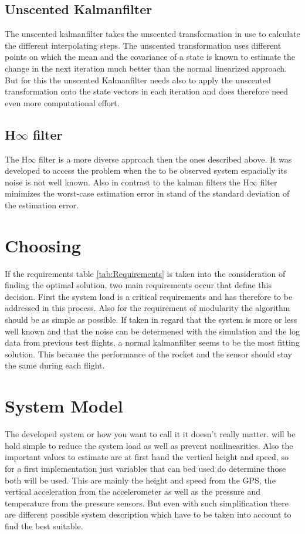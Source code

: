   \subsection{Unscented Kalmanfilter}
  The unscented kalmanfilter takes the unscented transformation in use to calculate the different interpolating steps.
  The unscented transformation uses different points on which the mean and the covariance of a state is known to estimate the 
  change in the next iteration much better than the normal linearized approach.
  But for this the unscented Kalmanfilter needs also to apply the unscented transformation onto the state vectors in each iteration
  and does therefore need even more computational effort.
  
  \subsection{H$\infty$ filter}
  The H$\infty$ filter is a more diverse approach then the ones described above.
  It was developed to access the problem when the to be observed system espacially its noise is not well known.
  Also in contrast to the kalman filters the H$\infty$ filter minimizes the worst-case estimation error 
  in stand of the standard deviation of the estimation error.
  
  \section{Choosing}
  If the requirements table \ref{tab:Requirements} is taken into the consideration of finding
  the optimal solution, two main requirements occur that define this decision.
  First the system load is a critical requirements and has therefore to be addressed in this process.
  Also for the requirement of modularity the algorithm should be as simple as possible.
  If taken in regard that the system is more or less well known and that the noise can be
  determened with the simulation and the log data from previous test flights,
  a normal kalmanfilter seems to be the most fitting solution.
  This because the performance of the rocket and the sensor should stay the same during
  each flight. 
  
  \section{System Model}
  The developed system or how you want to call it it doesn't really matter.
  will be hold simple to reduce the system load as well as prevent nonlinearities.
  Also the important values to estimate are at first hand the vertical height and speed, so
  for a first implementation just variables that can bed used do determine those both will be used.
  This are mainly the height and speed from the GPS, the vertical acceleration from the accelerometer
  as well as the pressure and temperature from the pressure sensors.
  But even with such simplification there are different possible system description which have to be taken into account 
  to find the best suitable.
  
